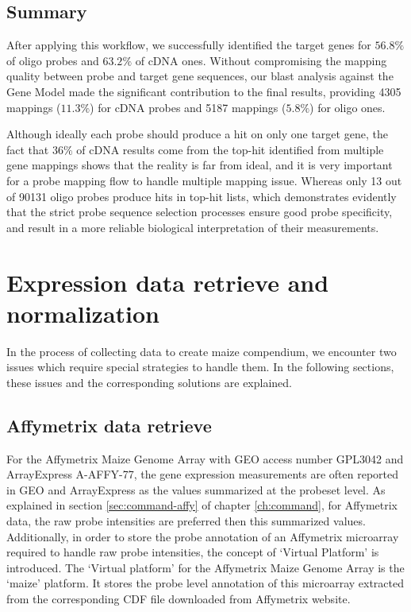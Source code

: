 \subsection*{Summary}

After applying this workflow, we successfully identified the target genes 
for $56.8\%$ of oligo probes and $63.2\%$ of cDNA ones. 
Without compromising the mapping quality between probe and target gene 
sequences, our blast analysis against the Gene Model made the significant 
contribution to the final results, providing 4305 mappings ($11.3\%$) for cDNA 
probes and 5187 mappings ($5.8\%$) for oligo ones.

Although ideally each probe should produce a hit on only one target 
gene, the fact that $36\%$ of cDNA results come from the top-hit identified 
from multiple gene mappings shows that the reality is far from ideal, and it is 
very important for a probe mapping flow to handle multiple mapping issue. 
Whereas only 13 out of 90131 oligo probes produce hits in top-hit lists, which 
demonstrates evidently that the strict probe sequence selection processes 
ensure good probe specificity, and result in a more reliable biological 
interpretation of their measurements.










\section{Expression data retrieve and normalization}\label{apd:magic-datanorm}

In the process of collecting data to create maize compendium, we encounter two 
issues which require special strategies to handle them. 
In the following sections, these issues and the corresponding solutions are 
explained.

\subsection{Affymetrix data retrieve}

For the Affymetrix Maize Genome Array with GEO access number GPL3042
and ArrayExpress A-AFFY-77, the gene expression measurements are often
reported in GEO and ArrayExpress as the values summarized at the
probeset level.
%
As explained in section \ref{sec:command-affy} of chapter
\ref{ch:command}, for Affymetrix data, the raw probe intensities are
preferred then this summarized values.
%
Additionally, in order to store the probe annotation of an Affymetrix
microarray required to handle raw probe intensities, the concept of
`Virtual Platform' is introduced.
%
The `Virtual platform' for the Affymetrix Maize Genome Array is the
`maize' platform.  It stores the probe level annotation of this
microarray extracted from the corresponding CDF file downloaded from
Affymetrix website.


